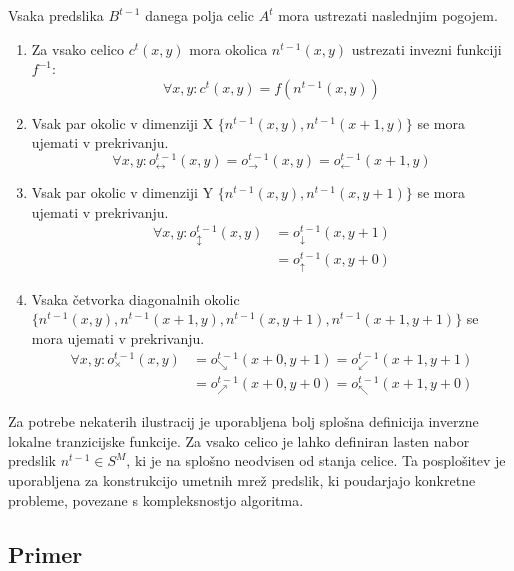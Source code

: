 \documentclass[12pt,a4paper,openany,twoside]{book}
\begin{document}
Vsaka predslika \(B^{t-1}\) danega polja celic \(A^t\) mora ustrezati naslednjim pogojem.
\begin{enumerate}
\item Za vsako celico \(c^{t}(x,y)\) mora okolica \(n^{t-1}(x,y)\) ustrezati invezni funkciji \(f^{-1}\):
\begin{equation}
\forall x,y : c^{t}(x,y) = f(n^{t-1}(x,y))
\end{equation}
\item Vsak par okolic v dimenziji X \(\{n^{t-1}(x,y), n^{t-1}(x+1,y)\}\) se mora ujemati v prekrivanju.
\begin{equation}
\forall x,y : o_{\leftrightarrow}^{t-1}(x,y) = o_{\rightarrow}^{t-1}(x,y) = o_{\leftarrow}^{t-1}(x+1,y)
\end{equation}
\item Vsak par okolic v dimenziji Y \(\{n^{t-1}(x,y), n^{t-1}(x,y+1)\}\) se mora ujemati v prekrivanju.
\begin{equation}
\begin{align}
\forall x,y : o_{\updownarrow}^{t-1}(x,y) &= o_{\downarrow}^{t-1}(x,y+1) \\
                                          &= o_{\uparrow}  ^{t-1}(x,y+0)
\end{align}
\end{equation}
\item Vsaka četvorka diagonalnih okolic \(\{n^{t-1}(x,y), n^{t-1}(x+1,y), n^{t-1}(x,y+1), n^{t-1}(x+1,y+1)\}\) se mora ujemati v prekrivanju.
\begin{equation}
\begin{align}
\forall x,y : o_{\times}^{t-1}(x,y) &= o_{\searrow}^{t-1}(x+0,y+1) = o_{\swarrow}^{t-1}(x+1,y+1) \\
                                    &= o_{\nearrow}^{t-1}(x+0,y+0) = o_{\nwarrow}^{t-1}(x+1,y+0)
\end{align}
\end{equation}
\end{enumerate}

Za potrebe nekaterih ilustracij je uporabljena bolj splošna definicija inverzne lokalne tranzicijske funkcije.
Za vsako celico je lahko definiran lasten nabor predslik \(n^{t-1} \in S^M\),
ki je na splošno neodvisen od stanja celice.
Ta posplošitev je uporabljena za konstrukcijo umetnih mrež predslik,
ki poudarjajo konkretne probleme, povezane s kompleksnostjo algoritma.

\subsection{Primer}
\end{document}
